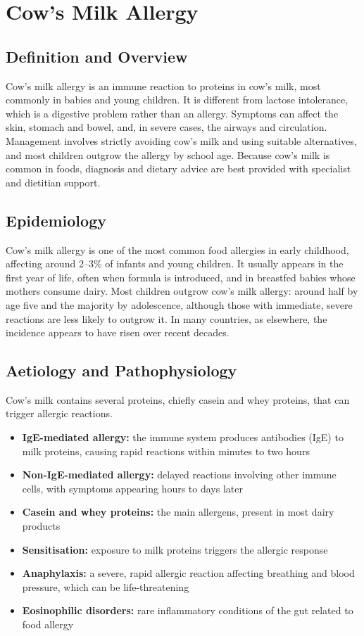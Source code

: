 \chapter{Cow's Milk Allergy}

\section*{Definition and Overview}
Cow's milk allergy is an immune reaction to proteins in cow's milk, most commonly in babies and young children. It is different from lactose intolerance, which is a digestive problem rather than an allergy. Symptoms can affect the skin, stomach and bowel, and, in severe cases, the airways and circulation. Management involves strictly avoiding cow's milk and using suitable alternatives, and most children outgrow the allergy by school age. Because cow's milk is common in foods, diagnosis and dietary advice are best provided with specialist and dietitian support.

\section*{Epidemiology}
Cow's milk allergy is one of the most common food allergies in early childhood, affecting around 2--3\% of infants and young children. It usually appears in the first year of life, often when formula is introduced, and in breastfed babies whose mothers consume dairy. Most children outgrow cow's milk allergy: around half by age five and the majority by adolescence, although those with immediate, severe reactions are less likely to outgrow it. In many countries, as elsewhere, the incidence appears to have risen over recent decades.

\section*{Aetiology and Pathophysiology}
Cow's milk contains several proteins, chiefly casein and whey proteins, that can trigger allergic reactions.

\begin{itemize}
    \item \textbf{IgE-mediated allergy:} the immune system produces antibodies (IgE) to milk proteins, causing rapid reactions within minutes to two hours
    \item \textbf{Non-IgE-mediated allergy:} delayed reactions involving other immune cells, with symptoms appearing hours to days later
    \item \textbf{Casein and whey proteins:} the main allergens, present in most dairy products
    \item \textbf{Sensitisation:} exposure to milk proteins triggers the allergic response
    \item \textbf{Anaphylaxis:} a severe, rapid allergic reaction affecting breathing and blood pressure, which can be life-threatening
    \item \textbf{Eosinophilic disorders:} rare inflammatory conditions of the gut related to food allergy
\end{itemize}

